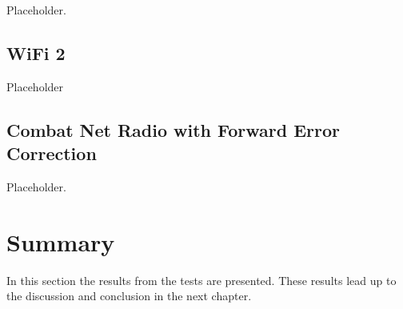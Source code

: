 Placeholder.


\subsection{WiFi 2}

Placeholder

\subsection{Combat Net Radio with Forward Error Correction}

Placeholder.

\section{Summary}

In this section the results from the tests are presented. These results lead up
to the discussion and conclusion in the next chapter.
